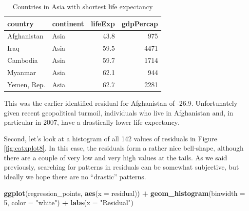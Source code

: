\documentclass[12pt, krantz2,]{krantz}
\makeatletter
\newenvironment{Shaded}{\begin{snugshade}}{\end{snugshade}}
\newcommand{\DataTypeTok}[1]{\textcolor[rgb]{0.27,0.27,0.27}{#1}}
\newcommand{\DecValTok}[1]{\textcolor[rgb]{0.06,0.06,0.06}{#1}}
\newcommand{\KeywordTok}[1]{\textcolor[rgb]{0.27,0.27,0.27}{\textbf{#1}}}
\newcommand{\NormalTok}[1]{#1}
\newcommand{\OperatorTok}[1]{\textcolor[rgb]{0.43,0.43,0.43}{\textbf{#1}}}
\newcommand{\StringTok}[1]{\textcolor[rgb]{0.5,0.5,0.5}{#1}}
\newenvironment{kframe}{%
\medskip{}
\setlength{\fboxsep}{.8em}
 \def\at@end@of@kframe{}%
 \ifinner\ifhmode%
  \def\at@end@of@kframe{\end{minipage}}%
  \begin{minipage}{\columnwidth}%
 \fi\fi%
 \def\FrameCommand##1{\hskip\@totalleftmargin \hskip-\fboxsep
 \colorbox{shadecolor}{##1}\hskip-\fboxsep
     \hskip-\linewidth \hskip-\@totalleftmargin \hskip\columnwidth}%
 \MakeFramed {\advance\hsize-\width
   \@totalleftmargin\z@ \linewidth\hsize
   \@setminipage}}%
 {\par\unskip\endMakeFramed%
 \at@end@of@kframe}
\renewenvironment{Shaded}{\begin{kframe}}{\end{kframe}}
\makeatother
\begin{document}
\begin{Shaded}
\end{Shaded}

\begin{table}[H]

\caption{\label{tab:unnamed-chunk-472}Countries in Asia with shortest life expectancy}
\centering
\fontsize{10}{12}\selectfont
\begin{tabular}{llrr}
\toprule
country & continent & lifeExp & gdpPercap\\
\midrule
Afghanistan & Asia & 43.8 & 975\\
Iraq & Asia & 59.5 & 4471\\
Cambodia & Asia & 59.7 & 1714\\
Myanmar & Asia & 62.1 & 944\\
Yemen, Rep. & Asia & 62.7 & 2281\\
\bottomrule
\end{tabular}
\end{table}

This was the earlier identified residual for Afghanistan of -26.9. Unfortunately
given recent geopolitical turmoil, individuals who live in Afghanistan and, in particular in 2007, have a
drastically lower life expectancy.

Second, let's look at a histogram of all 142 values of
residuals in Figure \ref{fig:catxplot8}. In this case, the residuals form a
rather nice bell-shape, although there are a couple of very low and very high
values at the tails. As we said previously, searching for patterns in residuals
can be somewhat subjective, but ideally we hope there are no ``drastic'' patterns.

\begin{Shaded}
\begin{Highlighting}[]
\KeywordTok{ggplot}\NormalTok{(regression_points, }\KeywordTok{aes}\NormalTok{(}\DataTypeTok{x =}\NormalTok{ residual)) }\OperatorTok{+}
\StringTok{  }\KeywordTok{geom_histogram}\NormalTok{(}\DataTypeTok{binwidth =} \DecValTok{5}\NormalTok{, }\DataTypeTok{color =} \StringTok{"white"}\NormalTok{) }\OperatorTok{+}
\StringTok{  }\KeywordTok{labs}\NormalTok{(}\DataTypeTok{x =} \StringTok{"Residual"}\NormalTok{)}
\end{Highlighting}
\end{Shaded}
\end{document}
